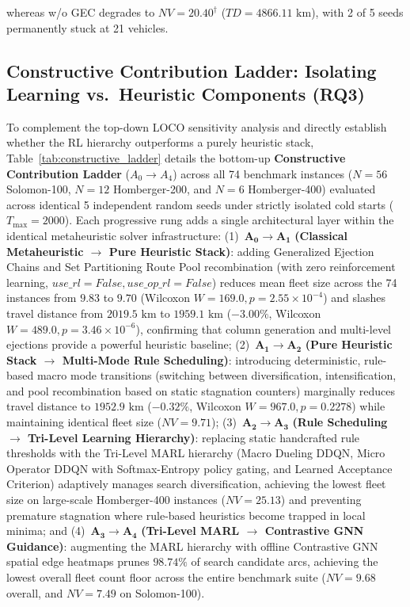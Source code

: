 \documentclass{ieeeaccess}
\begin{document}
whereas \textsf{w/o GEC} degrades to $NV=20.40^\dagger$ ($TD=4866.11\text{ km}$), with 2 of 5 seeds permanently stuck at 21 vehicles.


\subsection{Constructive Contribution Ladder: Isolating Learning vs.\ Heuristic Components (RQ3)}
\label{sec:constructive_ladder}

To complement the top-down LOCO sensitivity analysis and directly establish whether the RL hierarchy outperforms a purely heuristic stack, Table~\ref{tab:constructive_ladder} details the bottom-up \textbf{Constructive Contribution Ladder} ($A_0 \to A_4$) across all 74 benchmark instances ($N=56$ Solomon-100, $N=12$ Homberger-200, and $N=6$ Homberger-400) evaluated across identical 5 independent random seeds under strictly isolated cold starts ($T_{\max}=2000$). Each progressive rung adds a single architectural layer within the identical metaheuristic solver infrastructure: (1)~$\mathbf{A_0 \to A_1}$ \textbf{(Classical Metaheuristic $\to$ Pure Heuristic Stack)}: adding Generalized Ejection Chains and Set Partitioning Route Pool recombination (with zero reinforcement learning, $use\_rl=False, use\_op\_rl=False$) reduces mean fleet size across the 74 instances from $9.83$ to $9.70$ (Wilcoxon $W=169.0, p=2.55 \times 10^{-4}$) and slashes travel distance from $2019.5\text{ km}$ to $1959.1\text{ km}$ ($-3.00\%$, Wilcoxon $W=489.0, p=3.46 \times 10^{-6}$), confirming that column generation and multi-level ejections provide a powerful heuristic baseline; (2)~$\mathbf{A_1 \to A_2}$ \textbf{(Pure Heuristic Stack $\to$ Multi-Mode Rule Scheduling)}: introducing deterministic, rule-based macro mode transitions (switching between diversification, intensification, and pool recombination based on static stagnation counters) marginally reduces travel distance to $1952.9\text{ km}$ ($-0.32\%$, Wilcoxon $W=967.0, p=0.2278$) while maintaining identical fleet size ($NV=9.71$); (3)~$\mathbf{A_2 \to A_3}$ \textbf{(Rule Scheduling $\to$ Tri-Level Learning Hierarchy)}: replacing static handcrafted rule thresholds with the Tri-Level MARL hierarchy (Macro Dueling DDQN, Micro Operator DDQN with Softmax-Entropy policy gating, and Learned Acceptance Criterion) adaptively manages search diversification, achieving the lowest fleet size on large-scale Homberger-400 instances ($NV=25.13$) and preventing premature stagnation where rule-based heuristics become trapped in local minima; and (4)~$\mathbf{A_3 \to A_4}$ \textbf{(Tri-Level MARL $\to$ Contrastive GNN Guidance)}: augmenting the MARL hierarchy with offline Contrastive GNN spatial edge heatmaps prunes $98.74\%$ of search candidate arcs, achieving the lowest overall fleet count floor across the entire benchmark suite ($NV=9.68$ overall, and $NV=7.49$ on Solomon-100).
\end{document}
